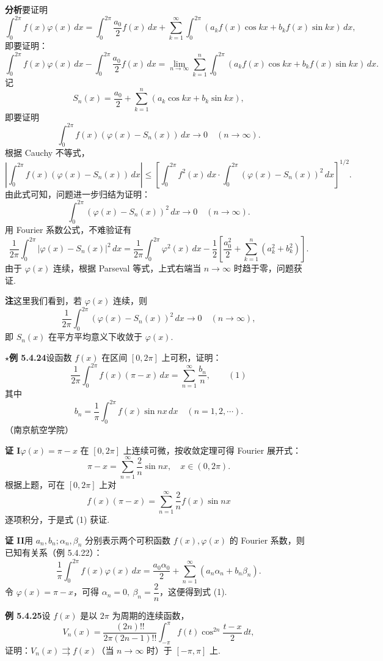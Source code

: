 \documentclass[UTF8,12pt,a4paper,fontset=fandol]{ctexart}
\begin{document}
\noindent\textbf{分析}\quad 要证明
\[
  \int_0^{2\pi}f(x)\varphi(x)\,dx
  =\int_0^{2\pi}\frac{a_0}{2}f(x)\,dx+
  \sum_{k=1}^{\infty}\int_0^{2\pi}(a_kf(x)\cos kx+b_kf(x)\sin kx)\,dx,
\]
即要证明：
\[
  \int_0^{2\pi}f(x)\varphi(x)\,dx-\int_0^{2\pi}\frac{a_0}{2}f(x)\,dx
  =\lim_{n\to\infty}\sum_{k=1}^{n}\int_0^{2\pi}(a_kf(x)\cos kx+b_kf(x)\sin kx)\,dx.
\]
记
\[
  S_n(x)=\frac{a_0}{2}+\sum_{k=1}^{n}(a_k\cos kx+b_k\sin kx),
\]
即要证明
\[
  \int_0^{2\pi}f(x)(\varphi(x)-S_n(x))\,dx\to0\quad(n\to\infty).
\]
根据 Cauchy 不等式，
\[
  \left|\int_0^{2\pi}f(x)(\varphi(x)-S_n(x))\,dx\right|
  \le\left[\int_0^{2\pi}f^2(x)\,dx\cdot
  \int_0^{2\pi}(\varphi(x)-S_n(x))^2\,dx\right]^{1/2}.
\]
由此式可知，问题进一步归结为证明：
\[
  \int_0^{2\pi}(\varphi(x)-S_n(x))^2\,dx\to0\quad(n\to\infty).
\]
用 Fourier 系数公式，不难验证有
\[
  \frac1{2\pi}\int_0^{2\pi}|\varphi(x)-S_n(x)|^2\,dx
  =\frac1{2\pi}\int_0^{2\pi}\varphi^2(x)\,dx
  -\frac12\left[\frac{a_0^2}{2}+\sum_{k=1}^{n}(a_k^2+b_k^2)\right].
\]
由于 $\varphi(x)$ 连续，根据 Parseval 等式，上式右端当 $n\to\infty$ 时趋于零，问题获证.

\noindent\textbf{注}\quad 这里我们看到，若 $\varphi(x)$ 连续，则
\[
  \frac1{2\pi}\int_0^{2\pi}(\varphi(x)-S_n(x))^2\,dx\to0\quad(n\to\infty),
\]
即 $S_n(x)$ 在平方平均意义下收敛于 $\varphi(x)$.

\noindent\(\star\)\textbf{例 5.4.24}\quad 设函数 $f(x)$ 在区间 $[0,2\pi]$ 上可积，证明：
\[
  \frac1{2\pi}\int_0^{2\pi}f(x)(\pi-x)\,dx=\sum_{n=1}^{\infty}\frac{b_n}{n}, \qquad(1)
\]
其中
\[
  b_n=\frac1\pi\int_0^{2\pi}f(x)\sin nx\,dx\quad(n=1,2,\cdots).
\]
（南京航空学院）

\noindent\textbf{证 I}\quad $\varphi(x)=\pi-x$ 在 $[0,2\pi]$ 上连续可微，按收敛定理可得 Fourier 展开式：
\[
  \pi-x=\sum_{n=1}^{\infty}\frac2n\sin nx,\quad x\in(0,2\pi).
\]
根据上题，可在 $[0,2\pi]$ 上对
\[
  f(x)(\pi-x)=\sum_{n=1}^{\infty}\frac2n f(x)\sin nx
\]
逐项积分，于是式 (1) 获证.

\noindent\textbf{证 II}\quad 用 $a_n,b_n;\alpha_n,\beta_n$ 分别表示两个可积函数 $f(x),\varphi(x)$ 的 Fourier 系数，则已知有关系（例 5.4.22）：
\[
  \frac1\pi\int_0^{2\pi}f(x)\varphi(x)\,dx
  =\frac{a_0\alpha_0}{2}+\sum_{n=1}^{\infty}(a_n\alpha_n+b_n\beta_n).
\]
令 $\varphi(x)=\pi-x$，可得 $\alpha_n=0,\ \beta_n=\dfrac2n$，这便得到式 (1).

\noindent\textbf{例 5.4.25}\quad 设 $f(x)$ 是以 $2\pi$ 为周期的连续函数，
\[
  V_n(x)=\frac{(2n)!!}{2\pi(2n-1)!!}\int_{-\pi}^{\pi}f(t)\cos^{2n}\frac{t-x}{2}\,dt,
\]
证明：$V_n(x)\rightrightarrows f(x)$（当 $n\to\infty$ 时）于 $[-\pi,\pi]$ 上.
\end{document}
